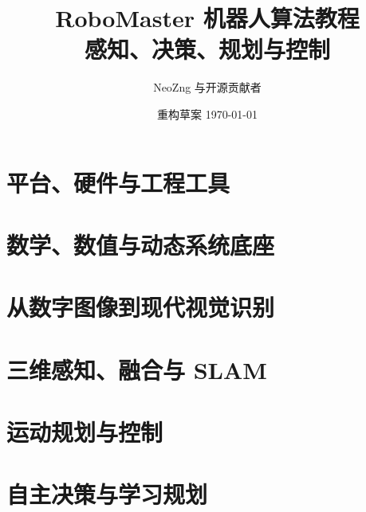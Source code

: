 \documentclass[UTF8,zihao=-4,openany,fontset=fandol]{ctexbook}
\title{RoboMaster 机器人算法教程\\[0.5em]\large 感知、决策、规划与控制}
\author{NeoZng 与开源贡献者}
\date{重构草案 \today}
\begin{document}
\frontmatter
\maketitle



\tableofcontents

\mainmatter

\part{平台、硬件与工程工具}




\part{数学、数值与动态系统底座}




\part{从数字图像到现代视觉识别}






\part{三维感知、融合与 SLAM}






\part{运动规划与控制}







\part{自主决策与学习规划}




\end{document}
